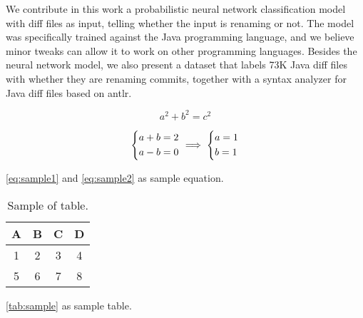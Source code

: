 We contribute in this work a probabilistic neural network classification model with diff files as input, telling whether the input is renaming or not.
The model was specifically trained against the Java programming language, and
we believe minor tweaks can allow it to work on other programming languages.
Besides the neural network model, we also present a dataset that labels 73K Java diff files with whether they are renaming commits,
together with a syntax analyzer for Java diff files based on {\sc antlr}.






\begin{equation}\label{eq:sample1}
	a^2 + b^2 = c^2
\end{equation}

\begin{equation}\label{eq:sample2}
	\begin{dcases}
		a + b = 2\\
		a - b = 0
	\end{dcases}
	\implies
	\begin{dcases}
		a = 1\\
		b = 1
	\end{dcases}
\end{equation}

\autoref{eq:sample1} and \ref{eq:sample2} as sample equation.


\begin{table} [h]
	\centering
	\caption{Sample of table.}
	\begin{tabular}{|c|c|c|c|}
		\hline
		\textbf{A} & \textbf{B} & \textbf{C} & \textbf{D} \\
		\hline
		1 & 2 & 3 & 4 \\
		\hline
		5 & 6 & 7 & 8 \\
		\hline
	\end{tabular}
	\label{tab:sample}
\end{table}

\autoref{tab:sample} as sample table.